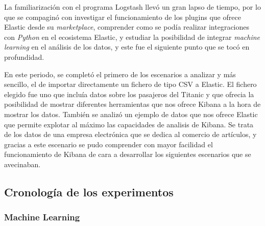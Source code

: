 La familiarización con el programa Logstash llevó un gran lapso de tiempo, por lo que se compaginó con investigar el funcionamiento de los plugins que ofrece Elastic desde su \textit{marketplace}, comprender como se podía realizar integraciones con \textit{Python} en el ecosistema Elastic, y estudiar la posibilidad de integrar \textit{machine learning} en el análisis de los datos, y este fue el siguiente punto que se tocó en profundidad.

En este periodo, se completó el primero de los escenarios a analizar y más sencillo, el de importar directamente un fichero de tipo CSV a Elastic. El fichero elegido fue uno que incluía datos sobre los pasajeros del Titanic y que ofrecia la posibilidad de mostrar diferentes herramientas que nos ofrece Kibana a la hora de mostrar los datos.
También se analizó un ejemplo de datos que nos ofrece Elastic que permite explotar al máximo las capacidades de analisis de Kibana. Se trata de los datos de una empresa electrónica que se dedica al comercio de artículos, y gracias a este escenario se pudo comprender con mayor facilidad el funcionamiento de Kibana de cara a desarrollar los siguientes escenarios que se avecinaban.

\paragraph{}
\paragraph{}
\paragraph{}
\paragraph{}
\paragraph{}


\subsection{Cronología de los experimentos}

\subsubsection{Machine Learning}

